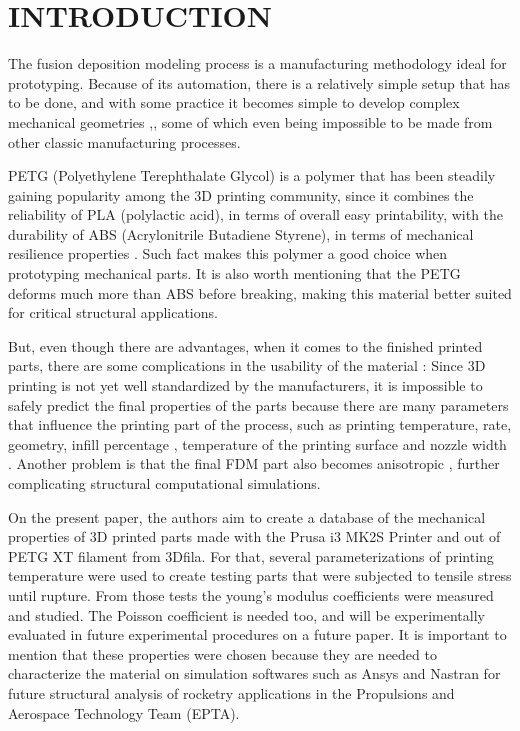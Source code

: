 \documentclass[10pt,fleqn,a4paper,twoside]{article}
\begin{document}
\section{INTRODUCTION}

The fusion deposition modeling process is a manufacturing methodology ideal for prototyping. Because of its automation, there is a relatively simple setup that has to be done, and with some practice it becomes simple to develop complex mechanical geometries \citep{fdm_today},\citep{metal_dental_implants}, some of which even being impossible to be made from other classic manufacturing processes.   

PETG (Polyethylene Terephthalate Glycol) is a polymer that has been steadily gaining popularity among the 3D printing community, since it combines the reliability of PLA (polylactic acid), in terms of overall easy printability, with the durability of ABS (Acrylonitrile Butadiene Styrene), in terms of mechanical resilience properties \citep{tiposfilamento}. Such fact makes this polymer a good choice when prototyping mechanical parts. It is also worth mentioning that the PETG deforms much more than ABS before breaking, making this material better suited for critical structural applications. 

But, even though there are advantages, when it comes to the finished printed parts, there are some complications in the usability of the material \citep{3Dcomplication}: Since 3D printing is not yet well standardized by the manufacturers, it is impossible to safely predict the final properties of the parts because there are many parameters that influence the printing part of the process, such as printing temperature, rate, geometry, infill percentage \citep{infill}, temperature of the printing surface \citep{temp_mesa} and nozzle width \citep{ABS_PLA_today}. Another problem is that the final FDM part also becomes anisotropic \citep{PETG}, further complicating structural computational simulations. 

On the present paper, the authors aim to create a database of the mechanical properties of 3D printed parts made with the Prusa i3 MK2S Printer and out of PETG XT filament from 3Dfila. For that, several parameterizations of printing temperature were used to create testing parts that were subjected to tensile stress until rupture. From those tests the young's modulus coefficients were measured and studied. The Poisson coefficient is needed too, and will be experimentally evaluated in future experimental procedures on a future paper. It is important to mention that these properties were chosen because they are needed to characterize the material on simulation softwares such as Ansys and Nastran for future structural analysis of rocketry applications in the Propulsions and Aerospace Technology Team (EPTA).  
\end{document}
